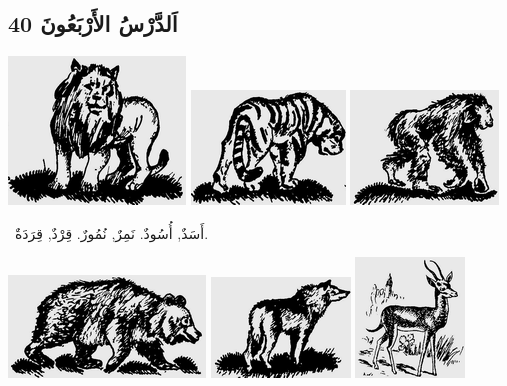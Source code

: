 \documentclass[a5paper]{article}
\begin{document}
\subsection[اَلدَّرْسُ الأَرْبَعُونَ 40]{اَلدَّرْسُ الأَرْبَعُونَ 40}
 \includegraphics[width=1.8543in,height=1.552in]{images/MuhammadBagauddinprettified-img112.png}   \includegraphics[width=1.6146in,height=1.198in]{images/MuhammadBagauddinprettified-img113.png}   \includegraphics[width=1.552in,height=1.198in]{images/MuhammadBagauddinprettified-img114.png} 

\ أَسَدٌ, أُسُودٌ. نَمِرٌ, نُمُورٌ. قِرْدٌ, قِرَدَةٌ. 

 \includegraphics[width=2.0626in,height=1.0728in]{images/MuhammadBagauddinprettified-img115.png}   \includegraphics[width=1.4583in,height=1.052in]{images/MuhammadBagauddinprettified-img116.png}   \includegraphics[width=1.1457in,height=1.2602in]{images/MuhammadBagauddinprettified-img117.png} 
\end{document}
